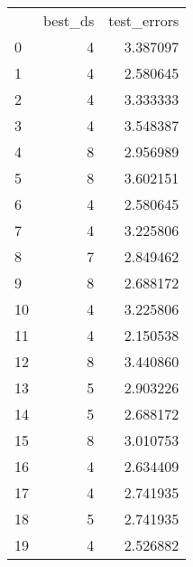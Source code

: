 \begin{tabular}{lrr}
 & best_ds & test_errors \\
0 & 4 & 3.387097 \\
1 & 4 & 2.580645 \\
2 & 4 & 3.333333 \\
3 & 4 & 3.548387 \\
4 & 8 & 2.956989 \\
5 & 8 & 3.602151 \\
6 & 4 & 2.580645 \\
7 & 4 & 3.225806 \\
8 & 7 & 2.849462 \\
9 & 8 & 2.688172 \\
10 & 4 & 3.225806 \\
11 & 4 & 2.150538 \\
12 & 8 & 3.440860 \\
13 & 5 & 2.903226 \\
14 & 5 & 2.688172 \\
15 & 8 & 3.010753 \\
16 & 4 & 2.634409 \\
17 & 4 & 2.741935 \\
18 & 5 & 2.741935 \\
19 & 4 & 2.526882 \\
\end{tabular}
